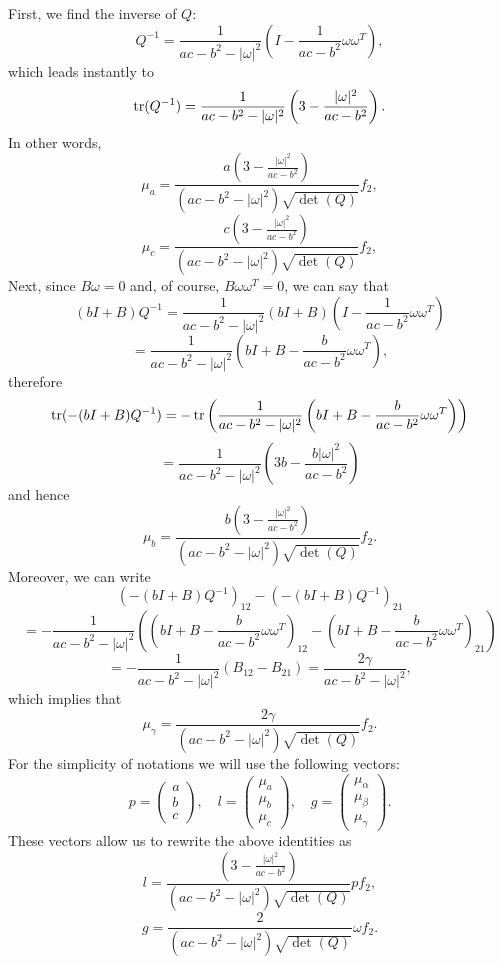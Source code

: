 First, we find the inverse of $Q$:
\[
    Q^{-1}=\frac{1}{ac-b^2-|\omega|^2}\left( I -\frac{1}{ac-b^2}\omega \omega^T \right),
\]
which leads instantly to
\[
    \operatorname{tr}(Q^{-1}) = \frac{1}{ac-b^2-|\omega|^2}\left(3-\frac{|\omega|^2}{ac-b^2}\right).
\]
In other words,
\[
    \mu_a =   \frac{ a\left(3-\frac{|\omega|^2}{ac-b^2}\right)}
    {(ac-b^2-|\omega|^2)\sqrt {\det(Q)}}f_2,
\]
\[
    \mu_c =  \frac{ c\left(3-\frac{|\omega|^2}{ac-b^2}\right)}
    {(ac-b^2-|\omega|^2)\sqrt {\det(Q)}}f_2,
\]
Next, since $B \omega =0$ and, of course, $B \omega \omega^T=0$, we can say that
\[
    (bI+B)Q^{-1} 
    =\frac{1}{ac-b^2-|\omega|^2} (bI+B) \left( I -\frac{1}{ac-b^2}\omega \omega^T \right)
\]
\[
    =\frac{1}{ac-b^2-|\omega|^2} \left( bI+B - \frac{b}{ac-b^2}\omega \omega^T \right),
\]
therefore
\[
    \operatorname{tr} (-(bI+B)Q^{-1}) 
    = -\operatorname{tr} \left( \frac{1}{ac-b^2-|\omega|^2} \left( bI+B - \frac{b}{ac-b^2}\omega \omega^T \right)\right)
\]
\[ 
    = \frac{1}{ac-b^2-|\omega|^2} \left( 3b   - \frac{b|\omega|^2}{ac-b^2}  \right)
\]
and hence
\[
    \mu_b = \frac{ b\left(3-\frac{|\omega|^2}{ac-b^2}\right)}
    {(ac-b^2-|\omega|^2)\sqrt {\det(Q)}}f_2.
\]
Moreover, we can write
\[
    (-(bI+B)Q^{-1})_{12} -(-(bI+B)Q^{-1})_{21} 
\]
\[
    = - \frac{1}{ac-b^2-|\omega|^2} \left(  \left(  bI+B - \frac{b}{ac-b^2}\omega \omega^T \right)_{12} -\left(  bI+B - \frac{b}{ac-b^2}\omega \omega^T \right)_{21}   \right)
\]
\[
    =- \frac{1}{ac-b^2-|\omega|^2} \left(  B _{12} -  B_{21}   \right)
    = \frac{2 \gamma}{ac-b^2-|\omega|^2},
\]
which implies that
\[
    \mu_{\gamma} =  \frac{2 \gamma}{(ac-b^2-|\omega|^2)\sqrt {\det(Q)}}f_2.
\]
For the simplicity of notations we will use the following vectors:
\[
    p = \begin{pmatrix}
        a\\b\\c
    \end{pmatrix},
    \quad
    l = \begin{pmatrix}
        \mu_a\\\mu_b\\\mu_c
    \end{pmatrix},
    \quad 
    g = \begin{pmatrix}
        \mu_{\alpha}\\\mu_{\beta}\\\mu_{\gamma}
    \end{pmatrix}.
\]
These vectors allow us to rewrite the above identities as
\[
    l = \frac{  \left(3-\frac{|\omega|^2}{ac-b^2}\right)}
    {(ac-b^2-|\omega|^2)\sqrt {\det(Q)}}pf_2,
\]
\[
    g =  \frac{2 }{(ac-b^2-|\omega|^2)\sqrt {\det(Q)}}\omega f_2.
\]
